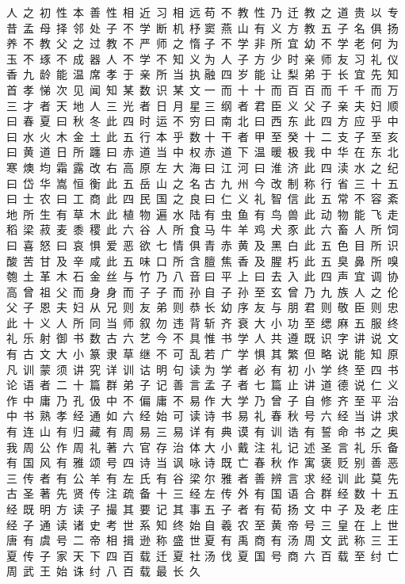 人~之~初~性~本~善~性~相~近~习~相~远
苟~不~教~性~乃~迁~教~之~道~贵~以~专
昔~孟~母~择~邻~处~子~不~学~断~机~杼
窦~燕~山~有~义~方~教~五~子~名~俱~扬
养~不~教~父~之~过~教~不~严~师~之~惰
子~不~学~非~所~宜~幼~不~学~老~何~为
玉~不~琢~不~成~器~人~不~学~不~知~义
为~人~子~方~少~时~亲~师~友~习~礼~仪
香~九~龄~能~温~席~孝~于~亲~所~当~执
融~四~岁~能~让~梨~弟~于~长~宜~先~知
首~孝~悌~次~见~闻~知~某~数~识~某~文
一~而~十~十~而~百~百~而~千~千~而~万
三~才~者~天~地~人~三~光~者~日~月~星
三~纲~者~君~臣~义~父~子~亲~夫~妇~顺
曰~春~夏~曰~秋~冬~此~四~时~运~不~穷
曰~南~北~曰~西~东~此~四~方~应~乎~中
曰~水~火~木~金~土~此~五~行~本~乎~数
十~干~者~甲~至~癸~十~二~支~子~至~亥
曰~黄~道~日~所~躔~曰~赤~道~当~中~权
赤~道~下~温~暖~极~我~中~华~在~东~北
寒~燠~均~霜~露~改~右~高~原~左~大~海
曰~江~河~曰~淮~济~此~四~渎~水~之~纪
曰~岱~华~嵩~恒~衡~此~五~岳~山~之~名
古~九~州~今~改~制~称~行~省~三~十~五
曰~士~农~曰~工~商~此~四~民~国~之~良
曰~仁~义~礼~智~信~此~五~常~不~容~紊
地~所~生~有~草~木~此~植~物~遍~水~陆
有~虫~鱼~有~鸟~兽~此~动~物~能~飞~走
稻~梁~菽~麦~黍~稷~此~六~谷~人~所~食
马~牛~羊~鸡~犬~豕~此~六~畜~人~所~饲
曰~喜~怒~曰~哀~惧~爱~恶~欲~七~情~俱
青~赤~黄~及~黑~白~此~五~色~目~所~识
酸~苦~甘~及~辛~咸~此~五~味~口~所~含
膻~焦~香~及~腥~朽~此~五~臭~鼻~所~嗅
匏~土~革~木~石~金~丝~与~竹~乃~八~音
曰~平~上~曰~去~入~此~四~声~宜~调~协
高~曾~祖~父~而~身~身~而~子~子~而~孙
自~子~孙~至~玄~曾~乃~九~族~人~之~伦
父~子~恩~夫~妇~从~兄~则~友~弟~则~恭
长~幼~序~友~与~朋~君~则~敬~臣~则~忠
此~十~义~人~所~同~当~师~叙~勿~违~背
斩~齐~衰~大~小~功~至~缌~麻~五~服~终
礼~乐~射~御~书~数~古~六~艺~今~不~具
惟~书~学~人~共~遵~既~识~字~讲~说~文
有~古~文~大~小~篆~隶~草~继~不~可~乱
若~广~学~惧~其~繁~但~略~说~能~知~原
凡~训~蒙~须~讲~究~详~训~诂~明~句~读
为~学~者~必~有~初~小~学~终~至~四~书
论~语~者~二~十~篇~群~弟~子~记~善~言
孟~子~者~七~篇~止~讲~道~德~说~仁~义
作~中~庸~乃~孔~伋~中~不~偏~庸~不~易
作~大~学~乃~曾~子~自~修~齐~至~平~治
中~书~熟~孝~经~通~如~六~经~始~可~读
诗~书~易~礼~春~秋~号~六~经~当~讲~求
有~连~山~有~归~藏~有~周~易~三~易~详
有~典~谟~有~训~诰~有~誓~命~书~之~奥
我~周~公~作~周~礼~著~六~官~存~治~体
大~小~戴~注~礼~记~述~圣~言~礼~乐~备
有~国~风~有~雅~颂~号~四~诗~当~讽~咏
诗~既~亡~春~秋~作~寓~褒~贬~别~善~恶
三~传~者~有~公~羊~有~左~氏~有~谷~梁
尔~雅~者~善~辨~言~求~经~训~此~莫~先
古~圣~著~先~贤~传~注~疏~备~十~三~经
左~传~外~有~国~语~合~群~经~数~十~五
经~既~明~方~读~子~撮~其~要~记~其~事
五~子~者~有~荀~扬~文~中~子~及~老~庄
经~子~通~读~诸~史~考~世~系~知~终~始
自~羲~农~至~黄~帝~号~三~皇~在~上~世
唐~有~虞~号~二~帝~相~揖~逊~称~盛~世
夏~有~禹~商~有~汤~周~文~武~称~三~王
夏~传~子~家~天~下~四~百~载~迁~夏~社
汤~伐~夏~国~号~商~六~百~载~至~纣~亡
周~武~王~始~诛~纣~八~百~载~最~长~久

